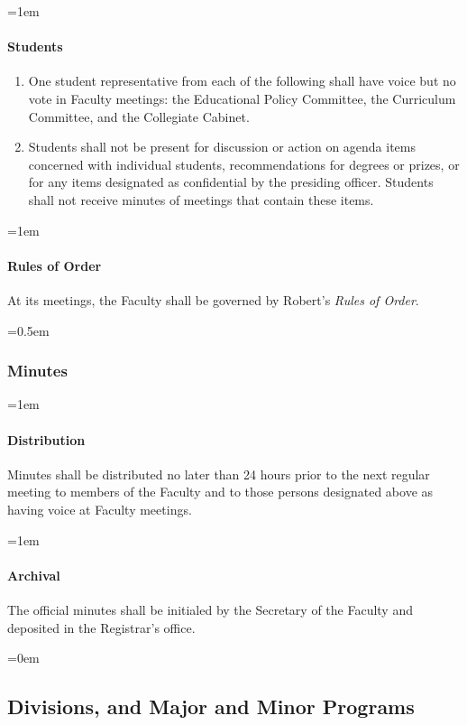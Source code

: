 \documentclass{manual}
\let\oldsubsection\subsection
\renewcommand\subsection{\leftskip=0em\oldsubsection}
\let\oldsubsubsection\subsubsection
\renewcommand\subsubsection{\leftskip=0.5em\oldsubsubsection}
\let\oldparagraph\paragraph
\renewcommand\paragraph{\leftskip=1em\oldparagraph}
\newcommand{\editRemove}[1]{}
\newcommand{\itemLevelA}{\alph*.}
\newcommand{\itemRefA}{\alph*}
\begin{document}
\paragraph{Students}
\begin{enumerate}[label=\itemLevelA,ref=\itemRefA]
\item One student representative from each of the following shall have voice but no vote in Faculty meetings: the Educational Policy Committee, the Curriculum Committee, and the Collegiate Cabinet.
\item Students shall not be present for discussion or action on agenda items concerned with individual students, recommendations for degrees or prizes, or for any items designated as confidential by the presiding officer. Students shall not receive minutes of meetings that contain these items.
\end{enumerate}

\paragraph{\editRemove{Robert's} Rules of Order}
At its meetings, the Faculty shall be governed by Robert's \emph{Rules of Order}. 

\subsubsection{Minutes}
\paragraph{Distribution} 
Minutes shall be distributed no later than 24 hours prior to the next regular meeting to members of the Faculty and to those persons designated above as having voice at Faculty meetings.

\paragraph{Archival} 
The official minutes shall be initialed by the Secretary of the Faculty and deposited in the Registrar's office.

\subsection{Divisions, and Major and Minor Programs}\label{sec:DivisionsAndMajorAndMinorPrograms}
\end{document}
